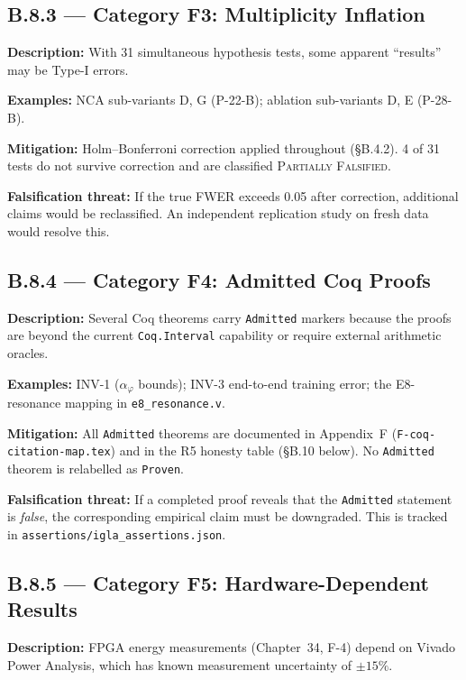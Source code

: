 \subsection*{B.8.3 — Category F3: Multiplicity Inflation}

\textbf{Description:} With 31 simultaneous hypothesis tests, some apparent
``results'' may be Type-I errors.

\textbf{Examples:} NCA sub-variants D, G (P-22-B); ablation sub-variants
D, E (P-28-B).

\textbf{Mitigation:} Holm--Bonferroni correction applied throughout (§B.4.2).
4 of 31 tests do not survive correction and are classified
\textsc{Partially Falsified}.

\textbf{Falsification threat:} If the true FWER exceeds 0.05 after correction,
additional claims would be reclassified.  An independent replication study
on fresh data would resolve this.

\subsection*{B.8.4 — Category F4: Admitted Coq Proofs}

\textbf{Description:} Several Coq theorems carry \texttt{Admitted} markers
because the proofs are beyond the current \texttt{Coq.Interval} capability
or require external arithmetic oracles.

\textbf{Examples:} INV-1 ($\alpha_\varphi$ bounds); INV-3 end-to-end training
error; the E8-resonance mapping in \texttt{e8\_resonance.v}.

\textbf{Mitigation:} All \texttt{Admitted} theorems are documented in
Appendix~F (\texttt{F-coq-citation-map.tex}) and in the R5 honesty table
(§B.10 below).  No \texttt{Admitted} theorem is relabelled as \texttt{Proven}.

\textbf{Falsification threat:} If a completed proof reveals that the
\texttt{Admitted} statement is \emph{false}, the corresponding empirical
claim must be downgraded.  This is tracked in
\texttt{assertions/igla\_assertions.json}.

\subsection*{B.8.5 — Category F5: Hardware-Dependent Results}

\textbf{Description:} FPGA energy measurements (Chapter~34, F-4) depend on
Vivado Power Analysis, which has known measurement uncertainty of $\pm 15\%$.

